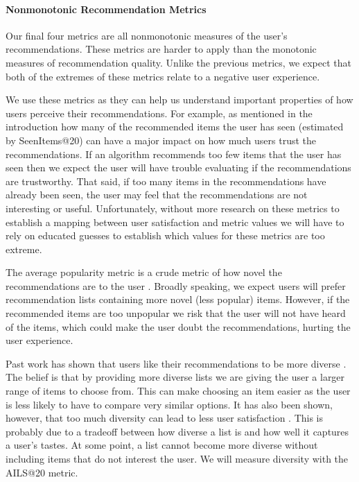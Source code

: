 \documentclass[letterpaper]{sig-alternate}
\begin{document}
  \paragraph{Nonmonotonic Recommendation Metrics}
  Our final four metrics are all nonmonotonic measures of the user's recommendations.
  These metrics are harder to apply than the monotonic measures of recommendation quality.
  Unlike the previous metrics, we expect that both of the extremes of these metrics relate to a negative user experience.

  We use these metrics as they can help us understand important properties of how users perceive their recommendations.
  For example, as mentioned in the introduction how many of the recommended items the user has seen (estimated by SeenItems@20) can have a major impact on how much users trust the recommendations.
  If an algorithm recommends too few items that the user has seen then we expect the user will have trouble evaluating if the recommendations are trustworthy.
  That said, if too many items in the recommendations have already been seen, the user may feel that the recommendations are not interesting or useful.
  Unfortunately, without more research on these metrics to establish a mapping between user satisfaction and metric values we will have to rely on educated guesses to establish which values for these metrics are too extreme.

  The average popularity metric is a crude metric of how novel the recommendations are to the user \cite{zieglerDiversity}.
  Broadly speaking, we expect users will prefer recommendation lists containing more novel (less popular) items.
  However, if the recommended items are too unpopular we risk that the user will not have heard of the items, which could make the user doubt the recommendations, hurting the user experience.

  Past work has shown that users like their recommendations to be more diverse \cite{zieglerDiversity, martijnDiversity}.
  The belief is that by providing more diverse lists we are giving the user a larger range of items to choose from.
  This can make choosing an item easier as the user is less likely to have to compare very similar options.
  It has also been shown, however, that too much diversity can lead to less user satisfaction \cite{zieglerDiversity}.
  This is probably due to a tradeoff between how diverse a list is and how well it captures a user's tastes.
  At some point, a list cannot become more diverse without including items that do not interest the user.
  We will measure diversity with the AILS@20 metric.
\end{document}

